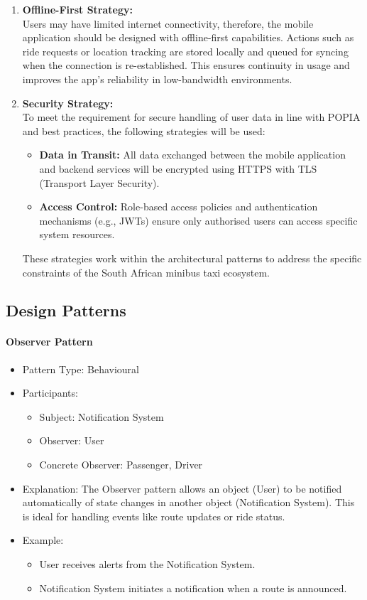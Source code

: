 \documentclass[a4paper,12pt]{article}
\begin{document}
\begin{enumerate}
    \item \textbf{Offline-First Strategy:}\\
    Users may have limited internet connectivity, therefore, the mobile application should be designed with offline-first capabilities. Actions such as ride requests or location tracking are stored locally and queued for syncing when the connection is re-established. This ensures continuity in usage and improves the app’s reliability in low-bandwidth environments.

    \item \textbf{Security Strategy:}\\
    To meet the requirement for secure handling of user data in line with POPIA and best practices, the following strategies will be used:
    \begin{itemize}
        \item \textbf{Data in Transit:} All data exchanged between the mobile application and backend services will be encrypted using HTTPS with TLS (Transport Layer Security).
        \item \textbf{Access Control:} Role-based access policies and authentication mechanisms (e.g., JWTs) ensure only authorised users can access specific system resources.
    \end{itemize}
    These strategies work within the architectural patterns to address the specific constraints of the South African minibus taxi ecosystem.
\end{enumerate}

\subsection{Design Patterns}

\paragraph{Observer Pattern}
\begin{itemize}
    \item Pattern Type: Behavioural
    \item Participants:
    \begin{itemize}
        \item Subject: Notification System
        \item Observer: User
        \item Concrete Observer: Passenger, Driver 
    \end{itemize}
    \item Explanation: The Observer pattern allows an object (User) to be notified automatically of state changes in another object (Notification System). This is ideal for handling events like route updates or ride status.
    \item Example:
    \begin{itemize}
        \item User receives alerts from the Notification System.
        \item Notification System initiates a notification when a route is announced.
    \end{itemize}
\end{itemize}
\end{document}

